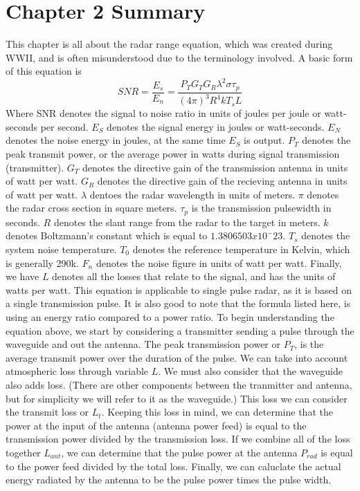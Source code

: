 \documentclass[12pt]{article}
\begin{document}
\section{Chapter 2 Summary}
This chapter is all about the radar range equation, which was created during WWII, and is often misunderstood due to the terminology involved. A basic form of this equation is 
\begin{equation}
    SNR = \frac{E_s}{E_n} =  \frac{P_T G_T G_R \lambda^2 \sigma \tau_p }{(4\pi)^3 R^4 k T_s L}
\end{equation}
Where SNR denotes the signal to noise ratio in units of joules per joule or watt-seconds per second. $E_S$ denotes the signal energy in joules or watt-seconds. $E_N$ denotes the noise energy in joules, at the same time $E_S$  is output. $P_T$ denotes the peak transmit power, or the average power in watts during signal transmission (transmitter). $G_T$ denotes the directive gain of the transmission antenna in units of watt per watt. $G_R$ denotes the directive gain of the recieving antenna in units of watt per watt. $\lambda$ dentoes the radar wavelength in units of meters. $\pi$ denotes the radar cross section in square meters. $\tau_p$ is the transmission pulsewidth in seconds. $R$ denotes the slant range from the radar to the target in meters. $k$ denotes Boltzmann's constant which is equal to $1.3806503x10^-23$. $T_s$ denotes the system noise temperature. $T_0$ denotes the reference temperature in Kelvin, which is generally 290k. $F_n$ denotes the noise figure in units of watt per watt. Finally, we have $L$ denotes all the losses that relate to the signal, and has the units of watts per watt. 
This equation is applicable to single pulse radar, as it is based on a single transmission pulse. It is also good to note that the formula listed here, is using an energy ratio compared to a power ratio. 
To begin understanding the equation above, we start by considering a transmitter sending a pulse through the waveguide and out the antenna. The peak transmission power or $P_T$, is the average transmit power over the duration of the pulse. We can take into account atmospheric loss through variable $L$. We must also consider that the waveguide also adds loss. (There are other components between the tranmitter and antenna, but for simplicity we will refer to it as the waveguide.) This loss we can consider the transmit loss or $L_t$. Keeping this loss in mind, we can determine that the power at the input of the antenna (antenna power feed) is equal to the transmission power divided by the transmission loss. If we combine all of the loss together $L_{ant}$, we can determine that the pulse power at the antenna $P_{rad}$ is equal to the power feed divided by the total loss. Finally, we can caluclate the actual energy radiated by the antenna to be the pulse power times the pulse width. 
\end{document}
